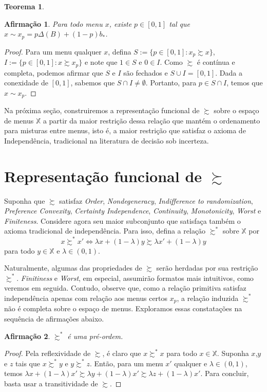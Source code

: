 \documentclass[11pt, a4paper]{article}
\theoremstyle{nonumberplain}
\newtheorem{proof}{Dem.}
\theoremstyle{plain}
\newtheorem{theorem}{Teorema}
\theoremstyle{plain}
\newtheorem{claim}{Afirmação}
\theoremstyle{plain}
\begin{document}
\begin{theorem} \label{nossoteorema}   \end{theorem} 


\begin{claim}Para todo menu $x$, existe $p\in[0,1]$ tal que $x\sim x_p=p\Delta(B)+(1-p)b_*$. \end{claim}
\begin{proof}
Para um menu qualquer $x$, defina $S:=\{p\in[0,1] : x_p\succsim x\}$, $I:=\{p\in[0,1] : x\succsim x_p\}$ e note que $1\in S$ e $0\in I$. Como $\succsim$ é contínua e completa, podemos afirmar que $S$ e $I$ são fechados e $S\cup I=[0,1]$. Dada a conexidade de $[0,1]$, sabemos que $S\cap I\neq \emptyset$. Portanto, para $p\in S\cap I$, temos que $x\sim x_p$.   
\end{proof}

Na próxima seção, construiremos a representação funcional de $\succsim$ sobre o espaço de menus $\mathbb{X}$ a partir da maior restrição dessa relação que mantém o ordenamento para misturas entre menus, isto é, a maior restrição que satisfaz o axioma de Independência, tradicional na literatura de decisão sob incerteza. 

\section{Representação funcional de $\succsim$}

Suponha que $\succsim$ satisfaz \textit{Order}, \textit{Nondegeneracy}, \textit{Indifference to randomization}, \textit{Preference Convexity}, \textit{Certainty Independence}, \textit{Continuity}, \textit{Monotonicity}, \textit{Worst} e \textit{Finiteness}. Considere agora seu maior subconjunto que satisfaça também o axioma tradicional de independência. Para isso, defina a relação $\succsim^*$ sobre $\mathbb{X}$ por $$x\succsim^* x' \Leftrightarrow \lambda x + (1-\lambda)y \succsim \lambda x' + (1-\lambda)y$$ para todo $y\in \mathbb{X}$ e $\lambda\in(0,1)$.

Naturalmente, algumas das propriedades de $\succsim$ serão herdadas por sua restrição $\succsim^*$. \textit{Finitiness} e \textit{Worst}, em especial, assumirão formatos mais intuitivos, como veremos em seguida. Contudo, observe que, como a relação primitiva satisfaz independência apenas com relação aos menus certos $x_p$, a relação induzida $\succsim^*$ não é completa sobre o espaço de menus. Exploramos essas constatações na sequência de afirmações abaixo.


\begin{claim}$\succsim^*$ é uma pré-ordem. \end{claim}
\begin{proof} Pela reflexividade de $\succsim$, é claro que $x\succsim^* x$ para todo $x\in \mathbb{X}$. Suponha $x$,$y$ e $z$ tais que $x\succsim^* y$ e $y\succsim^* z$. Então, para um menu $x'$ qualquer e $\lambda\in(0,1)$, temos $\lambda x + (1-\lambda)x'\succsim \lambda y + (1-\lambda)x'\succsim \lambda z + (1-\lambda)x'$. Para concluir, basta usar a transitividade de $\succsim$.
\end{proof}
\end{document}
